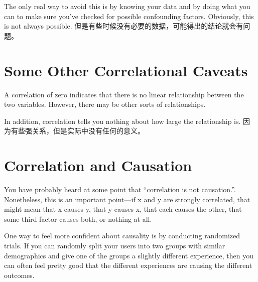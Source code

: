 The only real way to avoid this is by knowing your data and by doing what
you can to make sure you've checked for possible confounding factors.
Obviously, this is not always possible. 但是有些时候没有必要的数据，可能得出的结论就会有问题。
\section{Some Other Correlational Caveats}
A correlation of zero indicates that there is no linear relationship between
the two variables. However, there may be other sorts of relationships.

In addition, correlation tells you nothing about how large the relationship is. 因为有些强关系，但是实际中没有任何的意义。

\section{Correlation and Causation}
You have probably heard at some point that “correlation is not causation.”. Nonetheless, this is an
important point—if x and y are strongly correlated, that might mean that x
causes y, that y causes x, that each causes the other, that some third factor
causes both, or nothing at all.

One way to feel more confident about causality is by conducting
randomized trials. If you can randomly split your users into two groups with
similar demographics and give one of the groups a slightly different
experience, then you can often feel pretty good that the different
experiences are causing the different outcomes.